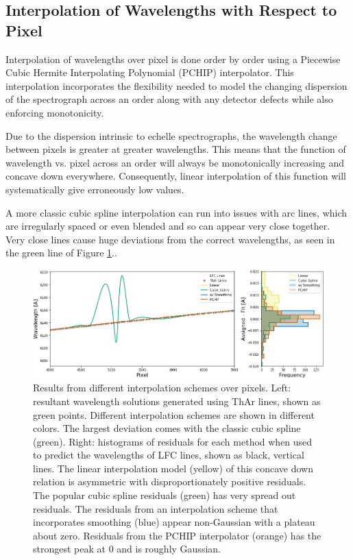 \documentclass[twocolumn]{aastex63}
\begin{document}
\subsection{Interpolation of Wavelengths with Respect to Pixel}
Interpolation of wavelengths over pixel  is done order by order using a Piecewise Cubic Hermite Interpolating Polynomial (PCHIP) interpolator.  This interpolation incorporates the flexibility needed to model the changing dispersion of the spectrograph across an order along with any detector defects while also enforcing monotonicity.

Due to the dispersion intrinsic to echelle spectrographs, the wavelength change between pixels is greater at greater wavelengths.  This means that the function of wavelength vs. pixel across an order will always be monotonically increasing and concave down everywhere.  Consequently, linear interpolation of this function will systematically give erroneously low values.

A more classic cubic spline interpolation can run into issues with arc lines, which are irregularly spaced or even blended and so can appear very close together.  Very close lines cause huge deviations from the correct wavelengths, as seen in the green line of Figure \ref{fig:xinterp}..

\begin{figure}[h]
\centering
\includegraphics[width=\textwidth]{Figures/intpx_tests.png}
\caption{Results from different interpolation schemes over pixels.
Left: resultant wavelength solutions generated using ThAr lines, shown as green points.  Different interpolation schemes are shown in different colors.  The largest deviation comes with the classic cubic spline (green).
Right: histograms of residuals for each method when used to predict the wavelengths of LFC lines, shown as black, vertical lines.  The linear interpolation model (yellow) of this concave down relation is asymmetric with disproportionately positive residuals.  The popular cubic spline residuals (green) has very spread out residuals.  The residuals from an interpolation scheme that incorporates smoothing (blue) appear non-Gaussian with a plateau about zero.  Residuals from the PCHIP interpolator (orange) has the strongest peak at 0 and is roughly Gaussian.}
\label{fig:xinterp}
\end{figure} 
\end{document}
